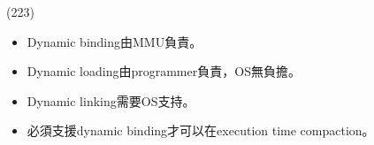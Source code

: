 \begin{theorem}{(223)} \quad\quad \begin{itemize}
        \item Dynamic binding由MMU負責。
        \item Dynamic loading由programmer負責，OS無負擔。
        \item Dynamic linking需要OS支持。
        \item 必須支援dynamic binding才可以在execution time compaction。
    \end{itemize}
\end{theorem}